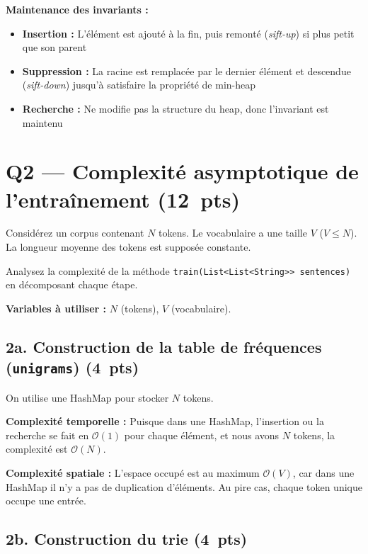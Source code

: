 \documentclass[12pt,a4paper]{article}
\newcommand{\pts}[1]{\hfill\textbf{\small(#1~pts)}}
\newcommand{\bigo}[1]{$\mathcal{O}(#1)$}
\newcommand{\answerspace}[1]{\vspace{#1}}
\begin{document}
\textbf{Maintenance des invariants :}
\begin{itemize}
  \item \textbf{Insertion :} L'élément est ajouté à la fin, puis remonté (\textit{sift-up}) si plus petit que son parent
  \item \textbf{Suppression :} La racine est remplacée par le dernier élément et descendue (\textit{sift-down}) jusqu'à satisfaire la propriété de min-heap
  \item \textbf{Recherche :} Ne modifie pas la structure du heap, donc l'invariant est maintenu
\end{itemize}

\answerspace{8em}

\newpage

\section{Q2 — Complexité asymptotique de l'entraînement \pts{12}}

Considérez un corpus contenant $N$ tokens. Le vocabulaire a une taille $V$
($V \leq N$). La longueur moyenne des tokens est supposée constante.

Analysez la complexité de la méthode \texttt{train(List<List<String>> sentences)}
en décomposant chaque étape.

\textbf{Variables à utiliser :} $N$ (tokens), $V$ (vocabulaire).

\subsection*{2a. Construction de la table de fréquences (\texttt{unigrams}) \pts{4}}

On utilise une HashMap pour stocker $N$ tokens.

\textbf{Complexité temporelle :} Puisque dans une HashMap, l'insertion ou la recherche se fait en $\mathcal{O}(1)$ pour chaque élément, et nous avons $N$ tokens, la complexité est \bigo{N}.

\textbf{Complexité spatiale :} L'espace occupé est au maximum $\mathcal{O}(V)$, car dans une HashMap il n'y a pas de duplication d'éléments. Au pire cas, chaque token unique occupe une entrée.

\answerspace{6em}

\subsection*{2b. Construction du trie \pts{4}}
\end{document}
